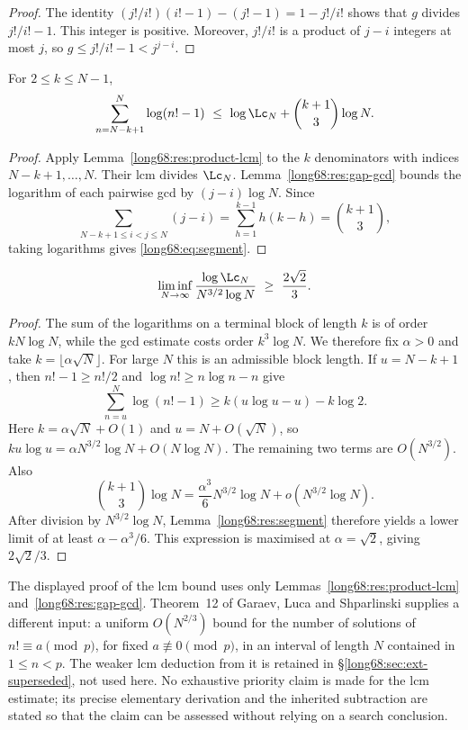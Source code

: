\begin{proof}
The identity
$(j!/i!)(i!-1)-(j!-1)=1-j!/i!$ shows that $g$ divides $j!/i!-1$.
This integer is positive. Moreover, $j!/i!$ is a product of $j-i$ integers
at most $j$, so $g\le j!/i!-1<j^{j-i}$.
\end{proof}

\begin{lemma}\label{long68:res:segment}
For $2\le k\le N-1$,
\begin{equation}\label{long68:eq:segment}
 \sum_{n=N-k+1}^{N}\log(n!-1)
 \ \le\ \log \Lc_N+\binom{k+1}{3}\log N.
\end{equation}


\end{lemma}

\begin{proof}
Apply Lemma~\ref{long68:res:product-lcm} to the $k$ denominators with
indices $N-k+1,\ldots,N$. Their lcm divides $\Lc_N$.
Lemma~\ref{long68:res:gap-gcd} bounds the logarithm of each pairwise gcd
by $(j-i)\log N$. Since
\[
 \sum_{N-k+1\le i<j\le N}(j-i)
 =\sum_{h=1}^{k-1}h(k-h)=\binom{k+1}{3},
\]
taking logarithms gives \eqref{long68:eq:segment}.
\end{proof}

\begin{theorem}\label{long68:res:lcm-growth}
\[
 \liminf_{N\to\infty}\frac{\log \Lc_N}{N^{3/2}\log N}
 \ \ge\ \frac{2\sqrt2}{3}.
\]
\end{theorem}

\begin{proof}
The sum of the logarithms on a terminal block of length $k$ is of order
$kN\log N$, while the gcd estimate costs order $k^3\log N$.
We therefore fix $\alpha>0$ and take $k=\lfloor\alpha\sqrt N\rfloor$.
For large $N$ this is an admissible block length. If $u=N-k+1$, then
$n!-1\ge n!/2$ and $\log n!\ge n\log n-n$ give
\[
 \sum_{n=u}^N\log(n!-1)\ge k(u\log u-u)-k\log2.
\]
Here $k=\alpha\sqrt N+O(1)$ and $u=N+O(\sqrt N)$, so
$ku\log u=\alpha N^{3/2}\log N+O(N\log N)$.
The remaining two terms are $O(N^{3/2})$. Also
\[
 \binom{k+1}{3}\log N
 =\frac{\alpha^3}{6}N^{3/2}\log N+o(N^{3/2}\log N).
\]
After division by $N^{3/2}\log N$, Lemma~\ref{long68:res:segment}
therefore yields a lower limit of at least $\alpha-\alpha^3/6$.
This expression is maximised at $\alpha=\sqrt2$, giving $2\sqrt2/3$.
\end{proof}

The displayed proof of the lcm bound uses only
Lemmas~\ref{long68:res:product-lcm} and~\ref{long68:res:gap-gcd}.
Theorem~12 of Garaev, Luca and Shparlinski
\cite[arXiv v1, p.~16]{garaev-luca-shparlinski} supplies a different input:
a uniform $O(N^{2/3})$ bound for the number of solutions of
$n!\equiv a\pmod p$, for fixed $a\not\equiv0\pmod p$, in an interval of
length $N$ contained in $1\le n<p$.  The weaker lcm deduction
from it is retained in \S\ref{long68:sec:ext-superseded}, not used here.
No exhaustive priority claim is made for the lcm estimate;
its precise elementary derivation and the inherited subtraction are stated
so that the claim can be assessed without relying on a search conclusion.


